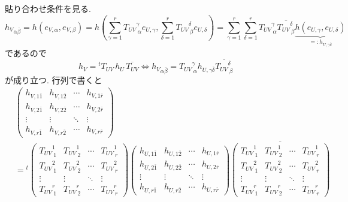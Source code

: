 \documentclass[dvipdfmx,a4paper,11pt]{article} %
\theoremstyle{definition}
\theoremstyle{remark}
\numberwithin{equation}{section}
\begin{document}
貼り合わせ条件を見る.
\begin{equation}
{h_V}_{\alpha\overline{\beta}}
=
h(e_{V,\alpha},e_{V,\beta})
=h \left(\sum_{\gamma=1}^{r} {T_{UV}}^{\gamma}_{\ \alpha} e_{U, \gamma}, 
\sum_{\delta=1}^{r} {T_{UV}}^{\delta}_{\ \beta} e_{U, \delta}\right)
=\sum_{\gamma=1}^{r}  \sum_{\delta=1}^{r}
{T_{UV}}^{\gamma}_{\ \alpha}
\overline{{T_{UV}}^{\delta}_{\ \beta}}
\underbrace{h(e_{U,\gamma},e_{U,\delta})}_{=:h_{U,\gamma\overline{\delta}}}
\end{equation}
であるので
\begin{equation}
\label{eq-hermitian-glue}
h_V={}^{t}T_{UV}\,h_U\,\overline{T_{UV}}
\Leftrightarrow
{h_V}_{\alpha \overline{\beta}}
=
{T_{UV}}^{\gamma}_{\ \alpha} h_{U,\gamma\overline{\delta}}\overline{{T_{UV}}^{\delta}_{\ \beta}}
\end{equation}
が成り立つ. 行列で書くと
\begin{equation}
\begin{aligned}
&\begin{pmatrix}
h_{V,1\overline 1}& h_{V,1\overline 2} & \cdots & h_{V,1\overline r} \\
h_{V,2\overline 1} & h_{V,2\overline 2} & \cdots & h_{V,2\overline r}\\
\vdots & \vdots & \ddots & \vdots\\
h_{V,r\overline 1}&h_{V,r\overline 2}  & \cdots & h_{V,r\overline r}
\end{pmatrix}
\\
&=
{}^t
\begin{pmatrix}
{T_{UV}}^{1}_{\ 1} & {T_{UV}}^{1}_{\ 2}& \cdots & {T_{UV}}^{1}_{\ r}\\
{T_{UV}}^{2}_{\ 1} & {T_{UV}}^{2}_{\ 2}& \cdots & {T_{UV}}^{2}_{\ r}\\
\vdots & \vdots & \ddots & \vdots\\
{T_{UV}}^{r}_{\ 1}& {T_{UV}}^{r}_{\ 2}& \cdots & {T_{UV}}^{r}_{\ r}
\end{pmatrix}
\begin{pmatrix}
h_{U,1\overline 1}& h_{U,1\overline 2} & \cdots & h_{U,1\overline r} \\
h_{U,2\overline 1} & h_{U,2\overline 2} & \cdots & h_{U,2\overline r}\\
\vdots & \vdots & \ddots & \vdots\\
h_{U,r\overline 1}&h_{U,r\overline 2}  & \cdots & h_{U,r\overline r}
\end{pmatrix}
\overline{
\begin{pmatrix}
{T_{UV}}^{1}_{\ 1} & {T_{UV}}^{1}_{\ 2}& \cdots & {T_{UV}}^{1}_{\ r}\\
{T_{UV}}^{2}_{\ 1} & {T_{UV}}^{2}_{\ 2}& \cdots & {T_{UV}}^{2}_{\ r}\\
\vdots & \vdots & \ddots & \vdots\\
{T_{UV}}^{r}_{\ 1}& {T_{UV}}^{r}_{\ 2}& \cdots & {T_{UV}}^{r}_{\ r}
\end{pmatrix}
}
\end{aligned}
\end{equation}
\end{document}
